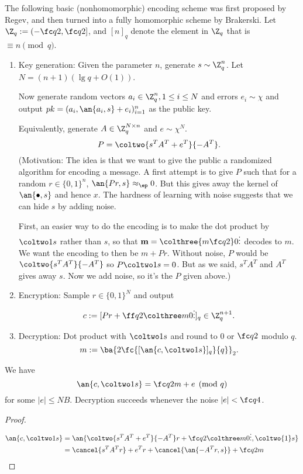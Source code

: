 The following basic (nonhomomorphic) encoding scheme was first proposed by Regev, and then turned into a fully homomorphic scheme by Brakerski. Let $\Z_q:=(-\fc q2,\fc q2]$, and $[n]_q$ denote the element in $\Z_q$ that is $\equiv n\pmod q$.
\begin{enumerate}
\item
Key generation: Given the parameter $n$, generate $s\sim \Z_q^n$. Let $N=(n+1)(\lg q+O(1))$.

Now generate random vectors $a_i\in \Z_q^{n},1\le i\le N$ and errors $e_i\sim \chi$ and output $pk=(a_i,\an{a_i,s}+e_i)_{i=1}^n$ as the public key. 

Equivalently, generate $A\in \Z_q^{N\times n}$ and $e\sim \chi^N$. 
\[
P=\coltwo{s^TA^T+e^T}{-A^T}.
\]
(Motivation: The idea is that we want to give the public a randomized algorithm for encoding a message. A first attempt is to give $P$ such that for a random $r\in \{0,1\}^n$, $\an{Pr,s}\approx_\ep 0$. But this gives away the kernel of $\an{\bullet,s}$ and hence $x$. The hardness of learning with noise suggests that we can hide $s$ by adding noise. 

First, an easier way to do the encoding is to make the dot product by $\coltwo 1s$ rather than $s$, so that $\mathbf m = \colthree {m\fc q2}0{\vdots}$ decodes to $m$. We want the encoding to then be $m+Pr$. Without noise, $P$ would be $\coltwo{s^TA^T}{-A^T}$ so $P\coltwo 1s=0$. But as we said, $s^TA^T$ and $A^T$ gives away $s$. Now we add noise, so it's the $P$ given above.)
\item
Encryption: Sample $r\in \{0,1\}^N$ and output
\[
c:=[Pr+\ff q2 \colthree m0{\vdots}]_q\in \Z_q^{n+1}.
\]
\item
Decryption: Dot product with $\coltwo 1s$ and round to 0 or $\fc q2$ modulo $q$.
\[
m:=\ba{{2\fc{[\an{c,\coltwo1s}]_q}{q}}}_2.
\]
\end{enumerate}
\begin{lem}
We have
\[
\an{c,\coltwo1s} = \fc q2 m + e\pmod q
\]
for some $|e|\le NB$. Decryption succeeds whenever the noise $|e|<\fc q4$.
\end{lem}
\begin{proof}
\begin{align*}
\an{c,\coltwo 1s} &= \an{\coltwo{s^TA^T+e^T}{-A^T}r+\fc q2\colthree m0{\vdots},\coltwo{1}s}\\
&=\cancel{s^TA^Tr} + e^Tr + \cancel{\an{-A^Tr,s}} + \fc q2m
\end{align*}
\end{proof}

